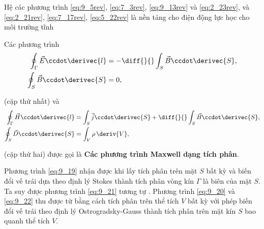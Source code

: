 Hệ các phương trình \eqref{eq:9_5rev}, \eqref{eq:7_3rev}, \eqref{eq:9_13rev} và \eqref{eq:2_23rev}, và \eqref{eq:2_21rev},
\eqref{eq:7_17rev}, \eqref{eq:5_22rev} là nền tảng cho điện động lực học cho môi trường tĩnh

Các phương trình
\begin{align}
    \oint_{\Gamma} \vec{E} \ccdot \derivec{l} &= - \diff{}{} \int_S \vec{B} \ccdot \derivec{S}, \label{eq:9_19}\\
    \oint_S \vec{B} \ccdot \derivec{S} &= 0, \label{eq:9_20}
\end{align}

\noindent
(cặp thứ nhất) và
\begin{align}
    \oint_{\Gamma} \vec{H} \ccdot \derivec{l} &= \int_S \vec{j} \ccdot \derivec{S} + \diff{}{} \int_S \vec{B} \ccdot \derivec{S}, \label{eq:9_21}\\
    \oint_S \vec{D} \ccdot \derivec{S} &= \int_V \rho\, \deriv{V}, \label{eq:9_22}
\end{align}

\noindent
(cặp thứ hai) được gọi là \textbf{Các phương trình Maxwell dạng tích phân}.

Phương trình \eqref{eq:9_19} nhận được khi lấy tích phân  trên mặt $S$ bất kỳ và biến đổi vế trái dựa theo định lý Stokes thành tích phân vòng kín $\Gamma$ là biên của mặt $S$.
Ta suy được phương trình \eqref{eq:9_21} tương tự .
Phương trình \eqref{eq:9_20} và \eqref{eq:9_22} thu được từ  bằng cách tích phân trên thể tích $V$ bất kỳ với phép biến đổi vế trái theo định lý Ostrogradsky-Gauss thành tích phân trên mặt kín $S$ bao quanh thể tích $V$.